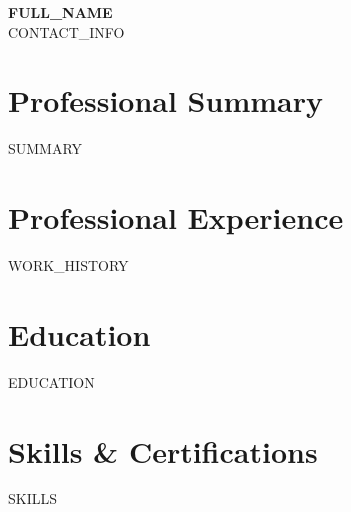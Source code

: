 \documentclass[11pt,a4paper]{article}
\begin{document}
\begin{center}
    {\Huge\bfseries\color{primary} {{FULL_NAME}}} \\
    \vspace{4pt}
    \small\color{secondary} {{CONTACT_INFO}}
\end{center}

\vspace{8pt}

\section*{Professional Summary}
{{SUMMARY}}

\section*{Professional Experience}
{{WORK_HISTORY}}

\section*{Education}
{{EDUCATION}}

\section*{Skills \& Certifications}
{{SKILLS}}
\end{document}
